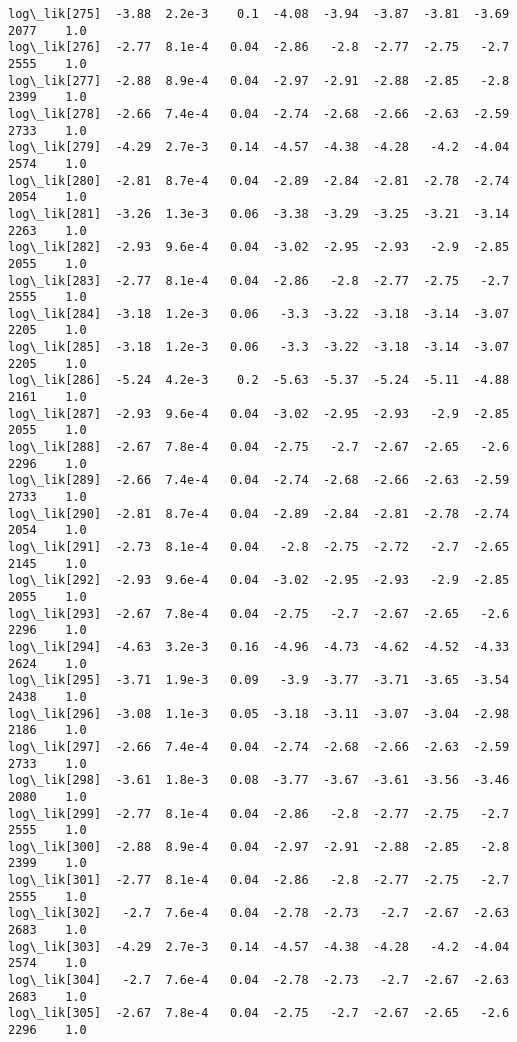 \documentclass[11pt]{article}
\begin{document}
\begin{Verbatim}[commandchars=\\\{\}]
log\_lik[275]  -3.88  2.2e-3    0.1  -4.08  -3.94  -3.87  -3.81  -3.69   2077    1.0
log\_lik[276]  -2.77  8.1e-4   0.04  -2.86   -2.8  -2.77  -2.75   -2.7   2555    1.0
log\_lik[277]  -2.88  8.9e-4   0.04  -2.97  -2.91  -2.88  -2.85   -2.8   2399    1.0
log\_lik[278]  -2.66  7.4e-4   0.04  -2.74  -2.68  -2.66  -2.63  -2.59   2733    1.0
log\_lik[279]  -4.29  2.7e-3   0.14  -4.57  -4.38  -4.28   -4.2  -4.04   2574    1.0
log\_lik[280]  -2.81  8.7e-4   0.04  -2.89  -2.84  -2.81  -2.78  -2.74   2054    1.0
log\_lik[281]  -3.26  1.3e-3   0.06  -3.38  -3.29  -3.25  -3.21  -3.14   2263    1.0
log\_lik[282]  -2.93  9.6e-4   0.04  -3.02  -2.95  -2.93   -2.9  -2.85   2055    1.0
log\_lik[283]  -2.77  8.1e-4   0.04  -2.86   -2.8  -2.77  -2.75   -2.7   2555    1.0
log\_lik[284]  -3.18  1.2e-3   0.06   -3.3  -3.22  -3.18  -3.14  -3.07   2205    1.0
log\_lik[285]  -3.18  1.2e-3   0.06   -3.3  -3.22  -3.18  -3.14  -3.07   2205    1.0
log\_lik[286]  -5.24  4.2e-3    0.2  -5.63  -5.37  -5.24  -5.11  -4.88   2161    1.0
log\_lik[287]  -2.93  9.6e-4   0.04  -3.02  -2.95  -2.93   -2.9  -2.85   2055    1.0
log\_lik[288]  -2.67  7.8e-4   0.04  -2.75   -2.7  -2.67  -2.65   -2.6   2296    1.0
log\_lik[289]  -2.66  7.4e-4   0.04  -2.74  -2.68  -2.66  -2.63  -2.59   2733    1.0
log\_lik[290]  -2.81  8.7e-4   0.04  -2.89  -2.84  -2.81  -2.78  -2.74   2054    1.0
log\_lik[291]  -2.73  8.1e-4   0.04   -2.8  -2.75  -2.72   -2.7  -2.65   2145    1.0
log\_lik[292]  -2.93  9.6e-4   0.04  -3.02  -2.95  -2.93   -2.9  -2.85   2055    1.0
log\_lik[293]  -2.67  7.8e-4   0.04  -2.75   -2.7  -2.67  -2.65   -2.6   2296    1.0
log\_lik[294]  -4.63  3.2e-3   0.16  -4.96  -4.73  -4.62  -4.52  -4.33   2624    1.0
log\_lik[295]  -3.71  1.9e-3   0.09   -3.9  -3.77  -3.71  -3.65  -3.54   2438    1.0
log\_lik[296]  -3.08  1.1e-3   0.05  -3.18  -3.11  -3.07  -3.04  -2.98   2186    1.0
log\_lik[297]  -2.66  7.4e-4   0.04  -2.74  -2.68  -2.66  -2.63  -2.59   2733    1.0
log\_lik[298]  -3.61  1.8e-3   0.08  -3.77  -3.67  -3.61  -3.56  -3.46   2080    1.0
log\_lik[299]  -2.77  8.1e-4   0.04  -2.86   -2.8  -2.77  -2.75   -2.7   2555    1.0
log\_lik[300]  -2.88  8.9e-4   0.04  -2.97  -2.91  -2.88  -2.85   -2.8   2399    1.0
log\_lik[301]  -2.77  8.1e-4   0.04  -2.86   -2.8  -2.77  -2.75   -2.7   2555    1.0
log\_lik[302]   -2.7  7.6e-4   0.04  -2.78  -2.73   -2.7  -2.67  -2.63   2683    1.0
log\_lik[303]  -4.29  2.7e-3   0.14  -4.57  -4.38  -4.28   -4.2  -4.04   2574    1.0
log\_lik[304]   -2.7  7.6e-4   0.04  -2.78  -2.73   -2.7  -2.67  -2.63   2683    1.0
log\_lik[305]  -2.67  7.8e-4   0.04  -2.75   -2.7  -2.67  -2.65   -2.6   2296    1.0

\end{Verbatim}
\end{document}
